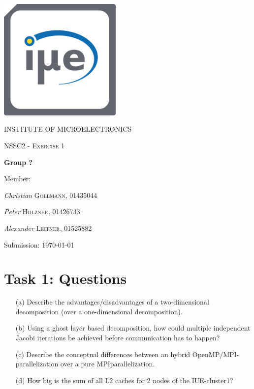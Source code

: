 \documentclass[11pt,a4paper]{article}
\begin{document}
\begin{titlepage}
	\centering
	\begin{center}
	\includegraphics[width=6cm]{Bilder/IuE-Logo.png}
	\end{center}
	{\scshape\LARGE INSTITUTE OF MICROELECTRONICS\par}
	\vspace{1cm}
	{\scshape\Large NSSC2 - Exercise 1\par}
	\vspace{1.5cm}
	{\huge\bfseries Group ?\par}
	\vspace{2cm}
	Member:\par
	{\Large\textit{Christian} \textsc{Gollmann, 01435044}\par}
	{\Large\textit{Peter} \textsc{Holzner, 01426733}\par}
	{\Large\textit{Alexander} \textsc{Leitner, 01525882}\par}
	\vspace{1.5cm}
	Submission: \today\par
	\vfill
\end{titlepage}
\tableofcontents 
\thispagestyle{empty}
\newpage

\setcounter{page}{1}
\section{Task 1: Questions}
\begin{itemize}	
\item[(a)] Describe the advantages/disadvantages of a two-dimensional decomposition (over a one-dimensional decomposition).
\item[(b)] Using a ghost layer based decomposition, how could multiple independent Jacobi iterations be achieved
before communication has to happen?
\item[(c)] Describe the conceptual differences between an hybrid OpenMP/MPI-parallelization over a pure MPIparallelization.
\item[(d)] How big is the sum of all L2 caches for 2 nodes of the IUE-cluster1?
\end{itemize}
\newpage
\end{document}
